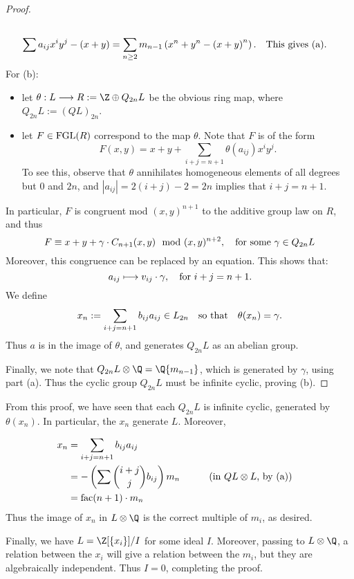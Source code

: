 \documentclass[11pt]{article}
\begin{document}
\begin{Formal Group Laws}
\begin{itemise}
\begin{proof}
\begin{alignat*}{2}
\\\sum a_{ij}x^iy^j-(x+y)&=\sum_{n\geq2}m_{n-1} \left(x^n+y^n-\left(x+y\right)^n\right).&& \textup{This gives (a).}
\end{alignat*}
For (b):
\begin{itemize}\squishlist
\item let $\theta:L\to R:=\Z\oplus Q_{2n}L$ be the obvious ring map, where $Q_{2n}L:=(QL)_{2n}$. 
\item let $F\in\FGL(R)$ correspond to the map $\theta$. Note that $F$ is of the form 
\[F(x,y)=x+y+\sum_{i+j=n+1}\theta(a_{ij})x^iy^j.\]
 To see this, observe that $\theta$ annihilates homogeneous elements of all degrees but 0 and $2n$, and $|a_{ij}|=2(i+j)-2=2n$ implies that $i+j=n+1$.
\end{itemize}
In particular, $F$ is congruent mod $(x,y)^{n+1}$ to the additive group law on $R$, and thus
\[F\equiv x+y+\gamma\cdot C_{n+1}(x,y)\mod{(x,y)^{n+2}},\textup{\quad for some $\gamma\in Q_{2n}L$}\]
Moreover, this congruence can be replaced by an equation. This shows that:
\[a_{ij}\mapsto v_{ij}\cdot \gamma,\textup{\quad for $i+j=n+1$.}\]
We define
\[x_{n}:=\sum_{i+j=n+1} b_{ij}a_{ij}\in L_{2n}\textup{\quad so that\quad }\theta(x_{n})=\gamma.\]
Thus $a$ is in the image of $\theta$, and generates $Q_{2n}L$ as an abelian group.

\INDENT Finally, we note that $Q_{2n}L\otimes\Q=\Q\{m_{n-1}\}$, which is generated by $\gamma$, using part (a). Thus the cyclic group $Q_{2n}L$ must be infinite cyclic, proving (b).
\end{proof}
\item From this proof, we have seen that each $Q_{2n}L$ is infinite cyclic, generated by $\theta(x_{n})$. In particular, the $x_n$ generate $L$. Moreover,

\begin{alignat*}{2}
x_n&=
\sum_{i+j=n+1} b_{ij}a_{ij}%
\\
&=
-\left(\sum{i+j\choose j}b_{ij}\right)m_{n}%
&\qquad&\text{(in $QL\otimes L$, by (a))} \\
&=
\textup{fac}(n+1)\cdot m_n%
 \end{alignat*}
Thus the image of $x_n$ in ${L}\otimes{\Q}$ is the correct multiple of $m_i$, as desired.
\item Finally, we have $L=\Z[\{x_i\}]/I$ for some ideal $I$. Moreover, passing to ${L}\otimes{\Q}$, a relation between the $x_i$ will give a relation between the $m_i$, but they are algebraically independent. Thus $I=0$, completing the proof.
\end{itemise}
\begin{shaded}

\end{shaded}
\end{Formal Group Laws}
\end{document}
